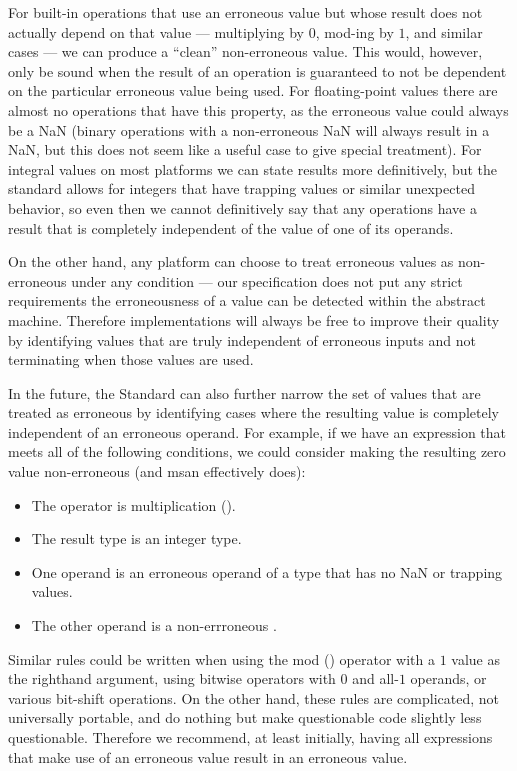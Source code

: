 For built-in operations that use an erroneous value but whose result does not actually depend on that value --- multiplying by $0$, mod-ing by $1$, and similar cases --- we can produce a ``clean'' non-erroneous value.  This would, however, only be sound when the result of an operation is guaranteed to not be dependent on the particular erroneous value being used.  For floating-point values there are almost no operations that have this property, as the erroneous value could always be a NaN (binary operations with a non-erroneous NaN will always result in a NaN, but this does not seem like a useful case to give special treatment).   For integral values on most platforms we can state results more definitively, but the standard allows for integers that have trapping values or similar unexpected behavior, so even then we cannot definitively say that any operations have a result that is completely independent of the value of one of its operands.

On the other hand, any platform can choose to treat erroneous values as non-erroneous under any condition --- our specification does not put any strict requirements the  erroneousness of a value can be detected within the abstract machine.   Therefore implementations will always be free to improve their quality by identifying values that are truly independent of erroneous inputs and not terminating when those values are used.

In the future, the Standard can also further narrow the set of values that are treated as erroneous by identifying cases where the resulting value is completely independent of an erroneous operand.  For example, if we have an expression that meets all of the following conditions, we could consider making the resulting zero value non-erroneous (and msan effectively does):
\begin{itemize}
\item The operator is multiplication (\tcode{*}).
\item The result type is an integer type.
\item One operand is an erroneous operand of a type that has no NaN or trapping values.
\item The other operand is a non-errroneous .
\end{itemize}
Similar rules could be written when using the mod (\tcode{\%}) operator with a $1$ value as the righthand argument, using bitwise operators with $0$ and all-$1$ operands, or various bit-shift operations.   On the other hand, these rules are complicated, not universally portable, and do nothing but make questionable code slightly less questionable.   Therefore we recommend, at least initially, having all expressions that make use of an erroneous value result in an erroneous value.

